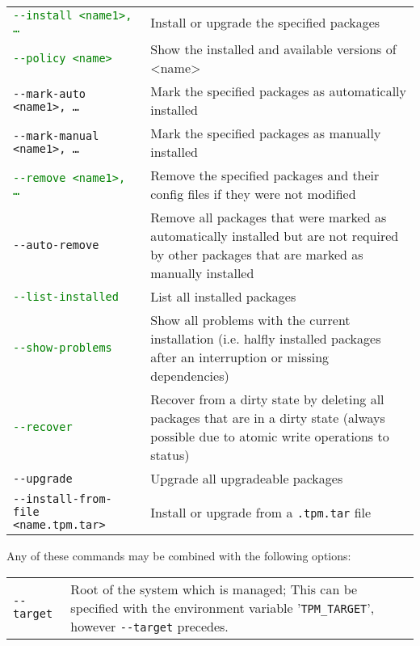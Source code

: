 \documentclass[a4paper]{article}
\newcommand{\variable}[1]{'\texttt{#1}'}
\newcommand{\green}[1]{\textcolor{green}{#1}}
\begin{document}
	\bgroup
	\def\arraystretch{1.5}
	\begin{tabularx}{\textwidth}{lX}
		\green{\texttt{-{}-install <name1>, \dots}} & Install or upgrade the specified packages \\
		
		\green{\texttt{-{}-policy <name>}} & Show the installed and available versions of <name> \\
		
		\texttt{-{}-mark-auto <name1>, \dots} & Mark the specified packages as automatically installed \\
		
		\texttt{-{}-mark-manual <name1>, \dots} & Mark the specified packages as manually installed \\
		
		\green{\texttt{-{}-remove <name1>, \dots}} & Remove the specified packages and their config files if they were not modified \\
		
		\texttt{-{}-auto-remove} & Remove all packages that were marked as automatically installed but are not required by other packages that are marked as manually installed \\
		
		\green{\texttt{-{}-list-installed}} & List all installed packages \\
		
		\green{\texttt{-{}-show-problems}} & Show all problems with the current installation (i.e. halfly installed packages after an interruption or missing dependencies) \\
		
		\green{\texttt{-{}-recover}} & Recover from a dirty state by deleting all packages that are in a dirty state (always possible due to atomic write operations to status) \\
		
		\texttt{-{}-upgrade} & Upgrade all upgradeable packages \\
		
		\texttt{-{}-install-from-file <name.tpm.tar>} & Install or upgrade from a \texttt{.tpm.tar} file \\
	\end{tabularx}
	\egroup

	\vspace{1em}
	Any of these commands may be combined with the following options: \\
	\bgroup
	\def\arraystretch{1.5}
	\begin{tabularx}{\textwidth}{lX}
		\texttt{-{}-target} & Root of the system which is managed; This can be specified with the environment variable \variable{TPM\_TARGET}, however \texttt{-{}-target} precedes. \\
	\end{tabularx}
	\egroup
	
\end{document}

